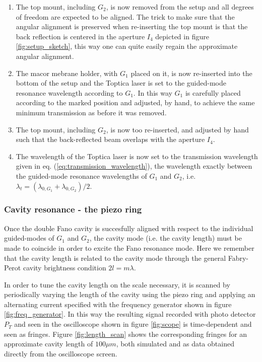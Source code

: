 \begin{enumerate}
    \item The top mount, including $G_2$, is now removed from the setup and all degrees of freedom are expected to be aligned. The trick to make sure that the angular alignment is preserved when re-inserting the top mount is that the back reflection is centered in the aperture $I_4$ depicted in figure \ref{fig:setup_sketch}, this way one can quite easily regain the approximate angular alignment.
    \item The macor mebrane holder, with $G_1$ placed on it, is now re-inserted into the bottom of the setup and the Toptica laser is set to the guided-mode resonance wavelength according to $G_1$. In this way $G_1$ is carefully placed according to the marked position and adjusted, by hand, to achieve the same minimum transmission as before it was removed. 
    \item The top mount, including $G_2$, is now too re-inserted, and adjusted by hand such that the back-reflected beam overlaps with the aperture $I_4$. 
    \item The wavelength of the Toptica laser is now set to the transmission wavelength given in eq. (\ref{eq:transmission_wavelength}), the wavelength exactly between the guided-mode resonance wavelengths of $G_1$ and $G_2$, i.e. $\lambda_t = (\lambda_{0,G_1} + \lambda_{0,G_2})/2$. 
\end{enumerate}

\subsubsection{Cavity resonance - the piezo ring}

Once the double Fano cavity is succesfully aligned with respect to the individual guided-modes of $G_1$ and $G_2$, the cavity mode (i.e. the cavity length) must be made to coincide in order to excite the Fano resonance mode. Here we remember that the cavity length is related to the cavity mode through the general Fabry-Perot cavity brightness condition $2 l = m \lambda$. 

In order to tune the cavity length on the scale necessary, it is scanned by periodically varying the length of the cavity using the piezo ring and applying an alternating current specified with the frequency generator shown in figure \ref{fig:freq_generator}. In this way the resulting signal recorded with photo detector $P_T$ and seen in the oscilloscope shown in figure \ref{fig:scope} is time-dependent and seen as fringes. Figure \ref{fig:length_scan} shows the corresponding fringes for an approximate cavity length of $100 \mu m$, both simulated and as data obtained directly from the oscilloscope screen.

